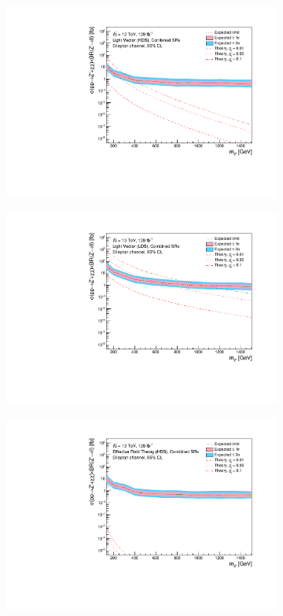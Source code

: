 \documentclass[12pt, a4paper]{book}
\begin{document}
\begin{figure}[!ht]
\begin{subfigure}[b]{0.49\textwidth}
      \includegraphics[width=1\textwidth]{Limits/Model_independent/LV_HDS/mass_exclusion_comb.pdf}
   \end{subfigure}
   \hfill
   \begin{subfigure}[b]{0.49\textwidth}
      \centering
      \includegraphics[width=1\textwidth]{Limits/Model_independent/LV_LDS/mass_exclusion_comb.pdf}
   \end{subfigure}
   \hfill
	\begin{subfigure}[b]{0.49\textwidth}
      \centering
      \includegraphics[width=1\textwidth]{Limits/Model_independent/EFT_HDS/mass_exclusion_comb.pdf}

\end{subfigure}
\end{figure}
\end{document}
